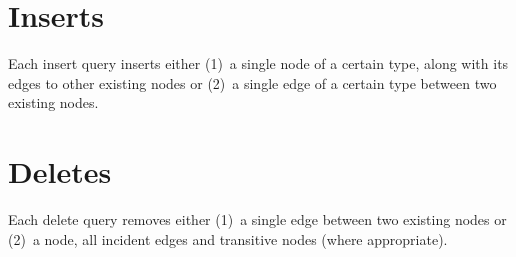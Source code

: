 


\section{Inserts}
\label{sec:inserts}

Each insert query inserts either (1)~a single node of a certain type, along with its edges to other existing nodes or (2)~a single edge of a certain type between two existing nodes.



\section{Deletes}
\label{sec:deletes}

Each delete query removes either (1)~a single edge between two existing nodes or (2)~a node, all incident edges and transitive nodes (where appropriate).


